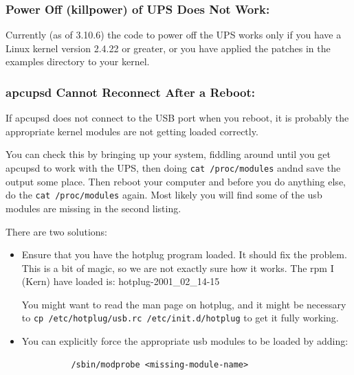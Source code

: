 {{{{\label{Power-Off-_005bkillpower_005d-of-UPS-Does-Not-Work}

\subsubsection*{Power Off (killpower) of UPS Does Not Work:}

\label{index-Problems_002c-Power-off-106}
\label{index-Problems_002c-killpower-107}
Currently (as of 3.10.6) the code to power off the UPS works only if you have
a Linux kernel version 2.4.22 or greater, or you have applied the patches in
the examples directory to your kernel. 

\label{apcupsd-Cannot-Reconnect-After-a-Reboot}

\subsubsection*{apcupsd Cannot Reconnect After a Reboot:}

\label{index-Problems_002c-reconnect-108}
If apcupsd does not connect to the USB port when you reboot, it is probably
the appropriate kernel modules are not getting loaded correctly.  

You can check this by bringing up your system, fiddling around until you get
apcupsd to work with the UPS, then doing {\tt cat /proc/modules} andnd save
the output some place. Then reboot your computer and before you do anything
else, do the {\tt cat /proc/modules} again. Most likely you will find some of
the usb modules are missing in the second listing.  

There are two solutions:  

\begin{itemize}
\item Ensure that you have the hotplug program loaded. It should fix the
   problem. This is a bit of magic, so we are not exactly sure how it works. The
   rpm I (Kern) have loaded is: hotplug-2001\_02\_14-15  

You might want to read the man page on hotplug, and it might be necessary to
{\tt cp /etc/hotplug/usb.rc /etc/init.d/hotplug} to get it fully working.  
\item You can explicitly force the appropriate usb modules to be loaded by
   adding:  

\footnotesize
\begin{verbatim}
          /sbin/modprobe <missing-module-name>
     
\end{verbatim}
\normalsize


\end{itemize}}}}}

